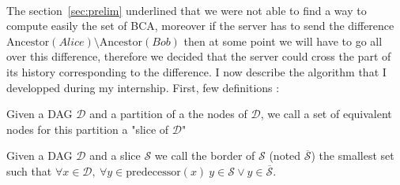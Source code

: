 \paragraph{} The section~\ref{sec:prelim} underlined that we were not able to find a way to compute easily the set of BCA, moreover if the server has to send the difference $\mathrm{Ancestor}(Alice) \setminus \mathrm{Ancestor}(Bob)$ then at some point we will have to go all over this difference, therefore we decided that the server could cross the part of its history corresponding to the difference. I now describe the algorithm that I developped during my internship. First, few definitions : 
\begin{definition}
 Given a DAG $\mathcal{D}$ and a partition of a the nodes of $\mathcal{D}$, we call a set of equivalent nodes for this partition a "slice of $\mathcal{D}$"
\end{definition}
\begin{definition}
 Given a DAG $\mathcal{D}$ and a slice $\mathcal{S}$ we call the border of $\mathcal{S}$ (noted $\overline{\mathcal S}$) the smallest set such that $\forall x \in \mathcal{D},\ \forall y\in \mathrm{predecessor}(x)\  y\in \mathcal{S} \vee y \in \overline{\mathcal S}$.
\end{definition}
